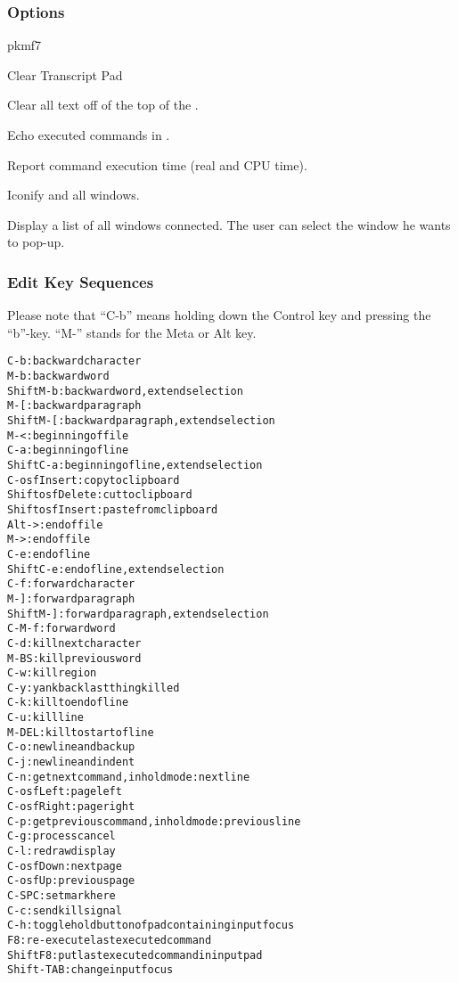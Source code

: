 \subsubsection*{Options}
\begin{PICTf}{pkmf7}
\begin{DLsf}{Clear Transcript Pad}
\item[Clear Transcript Pad]
         Clear all text off of the top of the \TP{}.
\item[Echo Command]
         Echo executed commands in \TP{}.
\item[Timing]
         Report command execution time (real and CPU time).
\item[Iconify]
         Iconify \EW{} and all windows.
\item[Raise Window]
         Display a list of all windows connected.
         The user can select the window he wants to pop-up. 
\end{DLsf}
\end{PICTf}

\subsubsection{Edit Key Sequences}
\label{ref:reedkey}

Please note that ``C-b'' means holding down the Control key and pressing the 
``b''-key. ``M-'' stands for the Meta or Alt key.

\begin{alltt}
C-b:              backward character
M-b:              backward word
Shift M-b:        backward word, extend selection
M-[:              backward paragraph
Shift M-[:        backward paragraph, extend selection
M-<:              beginning of file
C-a:              beginning of line
Shift C-a:        beginning of line, extend selection
C-osfInsert:      copy to clipboard
Shift osfDelete:  cut to clipboard
Shift osfInsert:  paste from clipboard
Alt->:            end of file
M->:              end of file
C-e:              end of line
Shift C-e:        end of line, extend selection
C-f:              forward character
M-]:              forward paragraph
Shift M-]:        forward paragraph, extend selection
C-M-f:            forward word
C-d:              kill next character
M-BS:             kill previous word
C-w:              kill region
C-y:              yank back last thing killed
C-k:              kill to end of line
C-u:              kill line
M-DEL:            kill to start of line
C-o:              newline and backup
C-j:              newline and indent
C-n:              get next command, in hold mode: next line
C-osfLeft:        page left
C-osfRight:       page right
C-p:              get previous command, in hold mode: previous line
C-g:              process cancel
C-l:              redraw display
C-osfDown:        next page
C-osfUp:          previous page
C-SPC:            set mark here
C-c:              send kill signal
C-h:              toggle hold button of pad containing input focus
F8:               re-execute last executed command
Shift F8:         put last executed command in input pad
Shift-TAB:        change input focus
\end{alltt}



